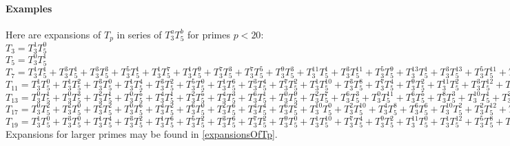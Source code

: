\paragraph{Examples}
Here are expansions of $T_p$ in series of $T_3^aT_5^b$ for primes $p<20$:\\
$T_{3} = T_3^{1}T_5^{0}$\\
$T_{5} = T_3^{0}T_5^{1}$\\
$T_{7} = T_3^{1}T_5^{1} + T_3^{3}T_5^{1} + T_3^{3}T_5^{3} + T_3^{5}T_5^{1} + T_3^{1}T_5^{7} + T_3^{1}T_5^{9} + T_3^{7}T_5^{3} + T_3^{7}T_5^{5} + T_3^{9}T_5^{3} + T_3^{11}T_5^{1} + T_3^{3}T_5^{11} + T_3^{5}T_5^{9} + T_3^{13}T_5^{1} + T_3^{3}T_5^{13} + T_3^{5}T_5^{11} + T_3^{9}T_5^{7} + T_3^{11}T_5^{5} + T_3^{13}T_5^{3} + T_3^{3}T_5^{15} + T_3^{7}T_5^{11} + T_3^{9}T_5^{9} + T_3^{13}T_5^{5} + T_3^{15}T_5^{3} + \dots $\\   
$T_{11} = T_3^{1}T_5^{0} + T_3^{1}T_5^{2} + T_3^{3}T_5^{0} + T_3^{1}T_5^{4} + T_3^{3}T_5^{2} + T_3^{5}T_5^{0} + T_3^{1}T_5^{6} + T_3^{3}T_5^{4} + T_3^{7}T_5^{2} + T_3^{1}T_5^{10} + T_3^{3}T_5^{8} + T_3^{7}T_5^{4} + T_3^{9}T_5^{2} + T_3^{11}T_5^{2} + T_3^{3}T_5^{12} + T_3^{5}T_5^{10} + T_3^{7}T_5^{8} + T_3^{11}T_5^{4} + T_3^{13}T_5^{2} + T_3^{9}T_5^{8} + T_3^{17}T_5^{0} + \dots $\\
$T_{13} = T_3^{0}T_5^{1} + T_3^{0}T_5^{3} + T_3^{2}T_5^{1} + T_3^{0}T_5^{5} + T_3^{4}T_5^{1} + T_3^{2}T_5^{5} + T_3^{4}T_5^{3} + T_3^{6}T_5^{1} + T_3^{0}T_5^{9} + T_3^{2}T_5^{7} + T_3^{6}T_5^{3} + T_3^{0}T_5^{11} + T_3^{6}T_5^{5} + T_3^{8}T_5^{3} + T_3^{10}T_5^{1} + T_3^{2}T_5^{11} + T_3^{4}T_5^{9} + T_3^{6}T_5^{7} + T_3^{10}T_5^{3} + T_3^{2}T_5^{13} + T_3^{4}T_5^{11} + T_3^{14}T_5^{1} + T_3^{2}T_5^{15} + T_3^{4}T_5^{13} + T_3^{6}T_5^{11} + T_3^{12}T_5^{5} + T_3^{16}T_5^{1} + \dots $\\
$T_{17} = T_3^{0}T_5^{2} + T_3^{2}T_5^{0} + T_3^{2}T_5^{2} + T_3^{0}T_5^{6} + T_3^{4}T_5^{2} + T_3^{6}T_5^{0} + T_3^{2}T_5^{6} + T_3^{4}T_5^{4} + T_3^{6}T_5^{2} + T_3^{10}T_5^{0} + T_3^{2}T_5^{10} + T_3^{4}T_5^{8} + T_3^{6}T_5^{6} + T_3^{10}T_5^{2} + T_3^{2}T_5^{12} + T_3^{6}T_5^{8} + T_3^{10}T_5^{4} + T_3^{2}T_5^{14} + T_3^{6}T_5^{10} + T_3^{8}T_5^{8} + T_3^{12}T_5^{4} + T_3^{14}T_5^{2} + T_3^{4}T_5^{14} + T_3^{8}T_5^{10} + T_3^{10}T_5^{8} + T_3^{12}T_5^{6} + T_3^{16}T_5^{2} + T_3^{18}T_5^{0} + \dots $\\
$T_{19} = T_3^{1}T_5^{0} + T_3^{3}T_5^{0} + T_3^{1}T_5^{4} + T_3^{3}T_5^{2} + T_3^{1}T_5^{6} + T_3^{5}T_5^{2} + T_3^{3}T_5^{6} + T_3^{7}T_5^{2} + T_3^{9}T_5^{0} + T_3^{1}T_5^{10} + T_3^{7}T_5^{4} + T_3^{9}T_5^{2} + T_3^{11}T_5^{0} + T_3^{1}T_5^{12} + T_3^{5}T_5^{8} + T_3^{11}T_5^{2} + T_3^{13}T_5^{0} + T_3^{3}T_5^{12} + T_3^{7}T_5^{8} + T_3^{9}T_5^{6} + T_3^{11}T_5^{4} + T_3^{13}T_5^{2} + T_3^{3}T_5^{14} + T_3^{7}T_5^{10} + T_3^{11}T_5^{6} + T_3^{15}T_5^{2} + T_3^{17}T_5^{0} + \dots $\\
Expansions for larger primes may be found in \ref{expansionsOfTp}.



